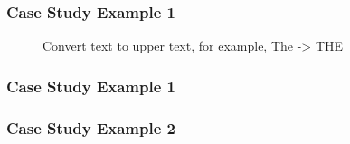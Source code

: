 \begin{frame}[plain,c]
	\frametitle{Case Study Example 1}
	\begin{figure}
		\centering
		
		\caption{Convert text to upper text, for example, The -> THE } \label{fig:DS3}
	\end{figure}
	
\end{frame}
\begin{frame}[plain,c]
	\frametitle{Case Study Example 1}
	\begin{figure}
		\centering
		
	\end{figure}


\end{frame}

\begin{frame}[plain,c]
	\frametitle{Case Study Example 2}
	\begin{figure}
		\centering
		
	\end{figure}
	
\end{frame}

